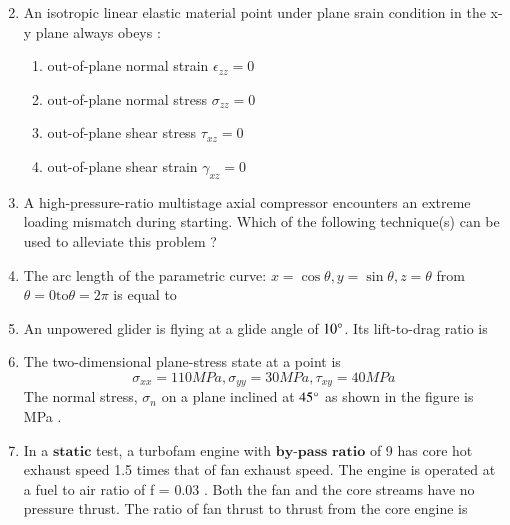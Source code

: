 \documentclass[journal]{IEEEtran}
\begin{document}
\begin{enumerate}
\begin{multicols}{2}
\begin{enumerate}
					\end{enumerate}
				\end{multicols}
	\item An isotropic linear elastic material point under plane srain condition in the x-y plane always obeys :
		\begin{enumerate}
			\item out-of-plane normal strain $\epsilon_{zz} = 0$
			\item out-of-plane normal stress $\sigma_{zz} = 0$
			\item out-of-plane shear stress $\tau_{xz} = 0$
			\item out-of-plane shear strain $\gamma_{xz} = 0$
		\end{enumerate}
	\item A high-pressure-ratio multistage axial compressor encounters an extreme loading mismatch during starting. Which of the following technique(s) can be used to alleviate this problem ?
		\begin{enumerate}
		\end{enumerate}
	\item The arc length of the parametric curve: $x = \cos{\theta}, y = \sin{\theta}, z = \theta$ from $\theta = 0 \text{to} \theta = 2 \pi$ is equal to
	\item An unpowered glider is flying at a glide angle of $10 \degree$. Its lift-to-drag ratio is \underline{  }
	\item The two-dimensional plane-stress state at a point is
		$$ \sigma_{xx} = 110 MPa, \sigma_{yy} = 30 MPa, \tau_{xy} = 40 MPa $$
		The normal stress, $\sigma_n$ on a plane inclined at $45 \degree$ as shown in the figure is \underline{  } MPa .
		\begin{figure}[H]
						\centering
						
					\end{figure}
	\item In a $\textbf{static}$ test, a turbofam engine with $\textbf{by-pass ratio}$ of 9 has core hot exhaust speed 1.5 times that of fan exhaust speed. The engine is operated at a fuel to air ratio of f = 0.03 . Both the fan and the core streams have no pressure thrust. The ratio of fan thrust to thrust from the core engine is \underline{   }

\end{enumerate}
\end{document}
